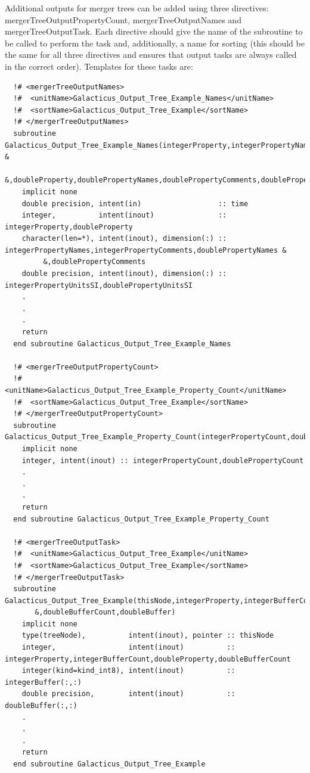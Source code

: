 Additional outputs for merger trees can be added using three directives: {\normalfont \ttfamily mergerTreeOutputPropertyCount}, {\normalfont \ttfamily mergerTreeOutputNames} and {\normalfont \ttfamily mergerTreeOutputTask}. Each directive should give the name of the subroutine to be called to perform the task and, additionally, a name for sorting (this should be the same for all three directives and ensures that output tasks are always called in the correct order). Templates for these tasks are:
\begin{verbatim}
  !# <mergerTreeOutputNames>
  !#  <unitName>Galacticus_Output_Tree_Example_Names</unitName>
  !#  <sortName>Galacticus_Output_Tree_Example</sortName>
  !# </mergerTreeOutputNames>
  subroutine Galacticus_Output_Tree_Example_Names(integerProperty,integerPropertyNames,integerPropertyComments,integerPropertyUnitsSI &
       &,doubleProperty,doublePropertyNames,doublePropertyComments,doublePropertyUnitsSI,time)
    implicit none
    double precision, intent(in)                  :: time
    integer,          intent(inout)               :: integerProperty,doubleProperty
    character(len=*), intent(inout), dimension(:) :: integerPropertyNames,integerPropertyComments,doublePropertyNames &
         &,doublePropertyComments
    double precision, intent(inout), dimension(:) :: integerPropertyUnitsSI,doublePropertyUnitsSI
    .
    .
    .
    return
  end subroutine Galacticus_Output_Tree_Example_Names

  !# <mergerTreeOutputPropertyCount>
  !#  <unitName>Galacticus_Output_Tree_Example_Property_Count</unitName>
  !#  <sortName>Galacticus_Output_Tree_Example</sortName>
  !# </mergerTreeOutputPropertyCount>
  subroutine Galacticus_Output_Tree_Example_Property_Count(integerPropertyCount,doublePropertyCount)
    implicit none
    integer, intent(inout) :: integerPropertyCount,doublePropertyCount
    .
    .
    .
    return
  end subroutine Galacticus_Output_Tree_Example_Property_Count

  !# <mergerTreeOutputTask>
  !#  <unitName>Galacticus_Output_Tree_Example</unitName>
  !#  <sortName>Galacticus_Output_Tree_Example</sortName>
  !# </mergerTreeOutputTask>
  subroutine Galacticus_Output_Tree_Example(thisNode,integerProperty,integerBufferCount,integerBuffer,doubleProperty&
       &,doubleBufferCount,doubleBuffer)
    implicit none
    type(treeNode),          intent(inout), pointer :: thisNode
    integer,                 intent(inout)          :: integerProperty,integerBufferCount,doubleProperty,doubleBufferCount
    integer(kind=kind_int8), intent(inout)          :: integerBuffer(:,:)
    double precision,        intent(inout)          :: doubleBuffer(:,:)
    .
    .
    .
    return
  end subroutine Galacticus_Output_Tree_Example
\end{verbatim}
